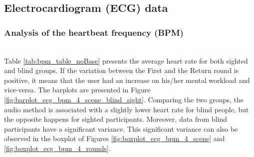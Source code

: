 \subsection{Electrocardiogram (ECG) data}
\label{subsubsec:results_ecg_2}

\subsubsection*{Analysis of the heartbeat frequency (BPM)}\mbox{}\\

Table \ref{tab:bpm_table_noBase} presents the average heart rate for both sighted and blind groups. If the variation between the First and the Return round is positive, it means that the user had an increase on his/her mental workload and vice-versa. The barplots are presented in Figure \ref{fig:barplot_ecg_bpm_4_scene_blind_sight}. Comparing the two groups, the audio method is associated with a slightly lower heart rate for blind people, but the opposite happens for sighted participants. Moreover, data from blind participants have a significant variance. This significant variance can also be observed in the boxplot of Figures \ref{fig:boxplot_ecg_bpm_4_scene} and \ref{fig:boxplot_ecg_bpm_4_rounds}. 



